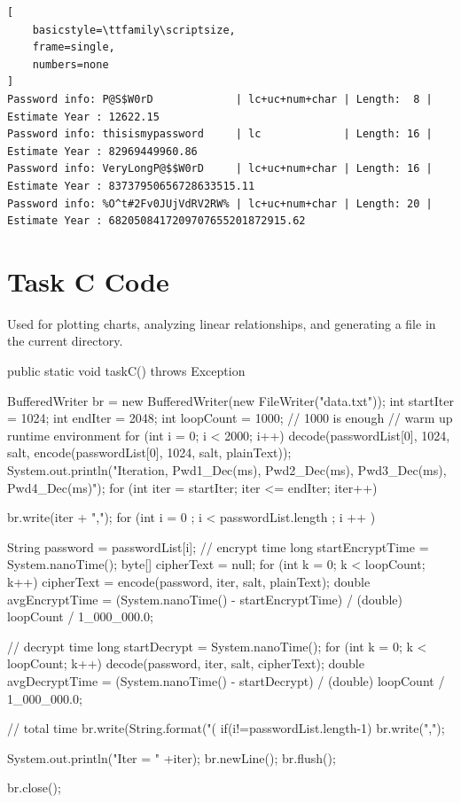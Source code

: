 \documentclass[12pt,a4paper]{article}
\begin{document}
\begin{lstlisting}[
    basicstyle=\ttfamily\scriptsize, 
    frame=single,
    numbers=none
]
Password info: P@S$W0rD             | lc+uc+num+char | Length:  8 | Estimate Year : 12622.15
Password info: thisismypassword     | lc             | Length: 16 | Estimate Year : 82969449960.86
Password info: VeryLongP@$$W0rD     | lc+uc+num+char | Length: 16 | Estimate Year : 83737950656728633515.11
Password info: %O^t#2Fv0JUjVdRV2RW% | lc+uc+num+char | Length: 20 | Estimate Year : 6820508417209707655201872915.62
\end{lstlisting}


\section{Task C Code}

Used for plotting charts, analyzing linear relationships, and generating a  file in the current directory.

\begin{mycode}
public static void taskC() throws Exception {
    BufferedWriter br = new BufferedWriter(new FileWriter("data.txt"));
    int startIter = 1024;
    int endIter = 2048;
    int loopCount = 1000; // 1000 is enough
    // warm up runtime environment
    for (int i = 0; i < 2000; i++)
        decode(passwordList[0], 1024, salt, encode(passwordList[0], 1024, salt, plainText));
    System.out.println("Iteration, Pwd1_Dec(ms), Pwd2_Dec(ms), Pwd3_Dec(ms), Pwd4_Dec(ms)");
    for (int iter = startIter; iter <= endIter; iter++) {
        br.write(iter + ",");
        for (int i = 0 ; i < passwordList.length ; i ++ ) {
            String password = passwordList[i];
            // encrypt time
            long startEncryptTime = System.nanoTime();
            byte[] cipherText = null;
            for (int k = 0; k < loopCount; k++)
                cipherText = encode(password, iter, salt, plainText);
            double avgEncryptTime = (System.nanoTime() - startEncryptTime) / (double) loopCount / 1_000_000.0;
            
            // decrypt time
            long startDecrypt = System.nanoTime();
            for (int k = 0; k < loopCount; k++) decode(password, iter, salt, cipherText);
            double avgDecryptTime = (System.nanoTime() - startDecrypt) / (double) loopCount / 1_000_000.0;
            
            // total time
            br.write(String.format("(%
            if(i!=passwordList.length-1)
                br.write(",");
        }
        System.out.println("Iter = " +iter);
        br.newLine();
        br.flush();
    }
    br.close();
}
\end{mycode}
\end{document}

